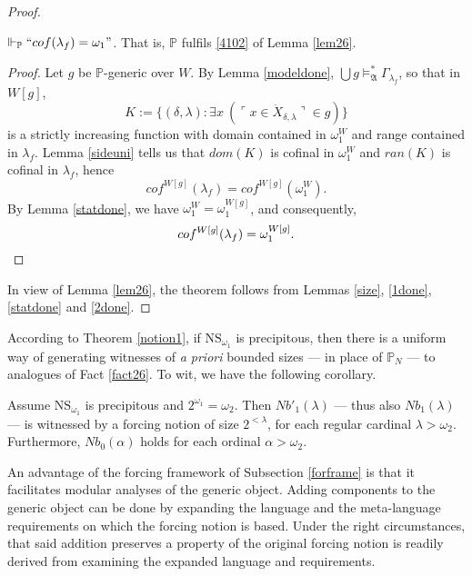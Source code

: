 \documentclass[12pt]{article}
\numberwithin{equation}{section}
\begin{document}
\begin{proof}
\begin{lem}\label{2done}
$\Vdash_{\mathbb{P}} ``cof(\lambda_f) = \omega_1"$. That is, $\mathbb{P}$ fulfils \ref{4102} of Lemma \ref{lem26}.
\end{lem}

\begin{proof}
Let $g$ be $\mathbb{P}$-generic over $W$. By Lemma \ref{modeldone}, $\bigcup g \models^*_{\mathfrak{A}} \Gamma_{\lambda_f}$, so that in $W[g]$, $$K := \{(\delta, \lambda) : \exists x \ (\ulcorner x \in \dot{X}_{\delta, \lambda} \urcorner \in g)\}$$ is a strictly increasing function with domain contained in $\omega_1^W$ and range contained in $\lambda_f$. Lemma \ref{sideuni} tells us that $dom(K)$ is cofinal in $\omega_1^W$ and $ran(K)$ is cofinal in $\lambda_f$, hence $$cof^{W[g]}(\lambda_f) = cof^{W[g]}(\omega_1^W).$$ By Lemma \ref{statdone}, we have $\omega_1^W = \omega_1^{W[g]}$, and consequently, 
\begin{equation*}
    cof^{W[g]}(\lambda_f) = \omega_1^{W[g]}.
    \qedhere
\end{equation*}
\end{proof}

In view of Lemma \ref{lem26}, the theorem follows from Lemmas \ref{size}, \ref{1done}, \ref{statdone} and \ref{2done}.
\end{proof}

According to Theorem \ref{notion1}, if $\mathrm{NS}_{\omega_1}$ is precipitous, then there is a uniform way of generating witnesses of \textit{a priori} bounded sizes --- in place of $\mathbb{P}_N$ --- to analogues of Fact \ref{fact26}. To wit, we have the following corollary.

\begin{cor}\label{nambacoro}
Assume $\mathrm{NS}_{\omega_1}$ is precipitous and $2^{\omega_1} = \omega_2$. Then $Nb'_1(\lambda)$ --- thus also $Nb_1(\lambda)$ --- is witnessed by a forcing notion of size $2^{< \lambda}$, for each regular cardinal $\lambda > \omega_2$. Furthermore, $Nb_0(\alpha)$ holds for each ordinal $\alpha > \omega_2$.
\end{cor}

An advantage of the forcing framework of Subsection \ref{forframe} is that it facilitates modular analyses of the generic object. Adding components to the generic object can be done by expanding the language and the meta-language requirements on which the forcing notion is based. Under the right circumstances, that said addition preserves a property of the original forcing notion is readily derived from examining the expanded language and requirements.
\end{document}
